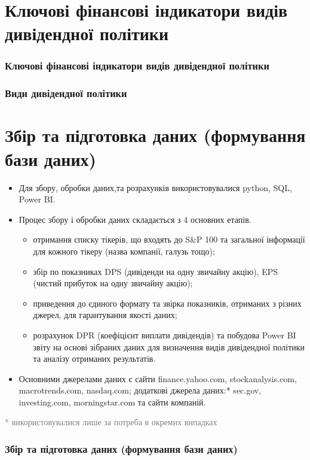 \documentclass[aspectratio=169]{beamer}
\begin{document}
\section{Ключові фінансові індикатори видів дивідендної політики}
\begin{frame}
\frametitle{Ключові фінансові індикатори видів дивідендної політики}

\end{frame}

\begin{frame}
\frametitle{Види дивідендної політики}

\end{frame}

\section{Збір та підготовка даних (формування бази даних)}
\begin{frame}
\begin{itemize}
\item Для збору, обробки даних,та розрахунків використовувалися python, SQL, Power BI.
\bigskip
\item \alert {Процес збору і обробки даних} складається з 4 основних етапів.
\begin{itemize}
    \item[\textcolor{orange}{\textbullet}] отримання списку тікерів, що входять до S&P 100 та загальної інформації для кожного тікеру (назва компанії, галузь тощо);
    \item[\textcolor{orange}{\textbullet}] збір по показниках DPS (дивіденди на одну звичайну акцію), EPS (чистий прибуток на одну звичайну акцію);
    \item[\textcolor{orange}{\textbullet}] приведення до єдиного формату та звірка показників, отриманих з різних джерел, для гарантування якості даних;
    \item[\textcolor{orange}{\textbullet}] розрахунок DPR (коефіцієнт виплати дивідендів) та побудова Power BI звіту на основі зібраних даних для визначення видів дивідендної політики та аналізу отриманих результатів.
\end{itemize}
\bigskip
\item \alert {Основними джерелами даних} є сайти finance.yahoo.com, stockanalysis.com, macrotrends.com, nasdaq.com; додаткові джерела даних:* sec.gov, investing.com, morningstar.com та сайти компаній.
\end{itemize}
\bigskip
\scriptsize \textcolor{gray}{* використовувалися лише за потреба в окремих випадках} 
\frametitle{Збір та підготовка даних (формування бази даних)}

\end{frame}
\end{document}
